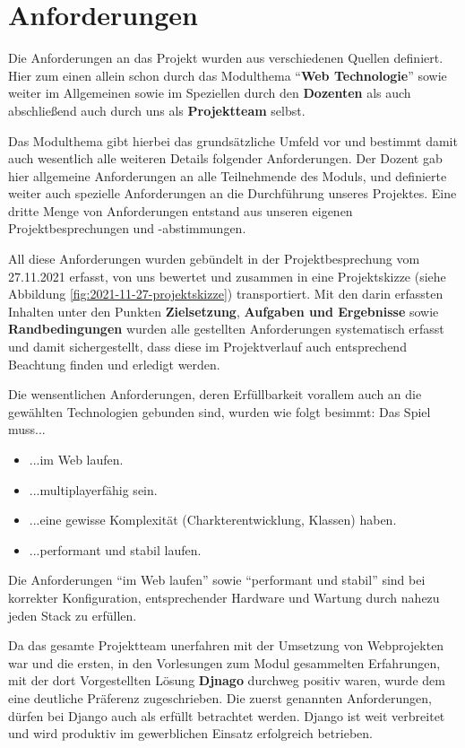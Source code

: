 
\section{Anforderungen} 

Die Anforderungen an das Projekt wurden aus verschiedenen Quellen definiert. Hier zum einen allein schon durch das Modulthema \enquote{\textbf{Web Technologie}} sowie weiter im Allgemeinen sowie im Speziellen durch den \textbf{Dozenten} als auch abschließend auch durch uns als \textbf{Projektteam} selbst. 

Das Modulthema gibt hierbei das grundsätzliche Umfeld vor und bestimmt damit auch wesentlich alle weiteren Details folgender Anforderungen. Der Dozent gab hier allgemeine Anforderungen an alle Teilnehmende des Moduls, und definierte weiter auch spezielle Anforderungen an die Durchführung unseres Projektes. Eine dritte Menge von Anforderungen entstand aus unseren eigenen Projektbesprechungen und -abstimmungen.  

All diese Anforderungen wurden gebündelt in der Projektbesprechung vom 27.11.2021 erfasst, von uns bewertet und zusammen in eine Projektskizze (siehe Abbildung  \ref{fig:2021-11-27-projektskizze}) transportiert. Mit den darin erfassten Inhalten unter den Punkten \textbf{Zielsetzung}, \textbf{Aufgaben und Ergebnisse} sowie \textbf{Randbedingungen} wurden alle gestellten Anforderungen systematisch erfasst und damit sichergestellt, dass diese im Projektverlauf auch entsprechend Beachtung finden und erledigt werden. 


Die wensentlichen Anforderungen, deren Erfüllbarkeit vorallem auch an die gewählten Technologien gebunden sind, wurden wie folgt besimmt: Das Spiel muss... \begin{itemize}
    \item ...im Web laufen.
    \item ...multiplayerfähig sein.
    \item ...eine gewisse Komplexität (Charkterentwicklung, Klassen) haben.
    \item ...performant und stabil laufen.
\end{itemize}


Die Anforderungen \enquote{im Web laufen} sowie \enquote{performant und stabil} sind bei korrekter Konfiguration, entsprechender Hardware und Wartung durch nahezu jeden \ac{Stack} zu erfüllen. 

Da das gesamte Projektteam unerfahren mit der Umsetzung von Webprojekten war und die ersten, in den Vorlesungen zum Modul gesammelten Erfahrungen, mit der dort Vorgestellten Lösung \textbf{Djnago} durchweg positiv waren, wurde dem eine deutliche Präferenz zugeschrieben. Die zuerst genannten Anforderungen, dürfen bei Django auch als erfüllt betrachtet werden. Django ist weit verbreitet und wird produktiv im gewerblichen Einsatz erfolgreich betrieben. 

